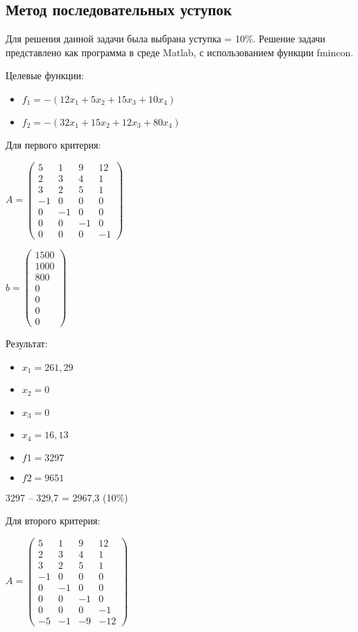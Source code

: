 \subsection{Метод последовательных уступок}

Для решения данной задачи была выбрана уступка = 10\%. Решение задачи представлено как программа в среде Matlab, с использованием функции fmincon.

Целевые функции:
\begin{itemize}
\item $f_1=-(12x_1+5x_2+15x_3+10x_4)$
\item $f_2=-(32x_1+15x_2+12x_3+80x_4)$
\end{itemize}

Для первого критерия:

$A =
\begin{pmatrix}
  5 & 1 & 9 & 12 \\
  2 & 3 & 4 & 1 \\
  3 & 2 & 5 & 1 \\
  -1& 0 & 0 & 0 \\
  0 &-1 & 0 & 0 \\
  0 & 0 &-1 & 0 \\
  0 & 0 & 0 & -1
\end{pmatrix}$

$b =
\begin{pmatrix}
  1500 \\
  1000 \\
  800 \\
  0 \\
  0 \\
  0 \\
  0
\end{pmatrix}$

Результат:
\begin{itemize}
\item $x_1 = 261,29$
\item $x_2 = 0$
\item $x_3 = 0$
\item $x_4 = 16,13$
\item $f1 = 3297$
\item $f2 = 9651$
\end{itemize}

3297 – 329,7 = 2967,3  (10\%)

Для второго критерия:

$A =
\begin{pmatrix}
  5 & 1 & 9 & 12 \\
  2 & 3 & 4 & 1 \\
  3 & 2 & 5 & 1 \\
  -1& 0 & 0 & 0 \\
  0 &-1 & 0 & 0 \\
  0 & 0 &-1 & 0 \\
  0 & 0 & 0 & -1 \\
  -5 & -1 & -9 & -12
\end{pmatrix}$

